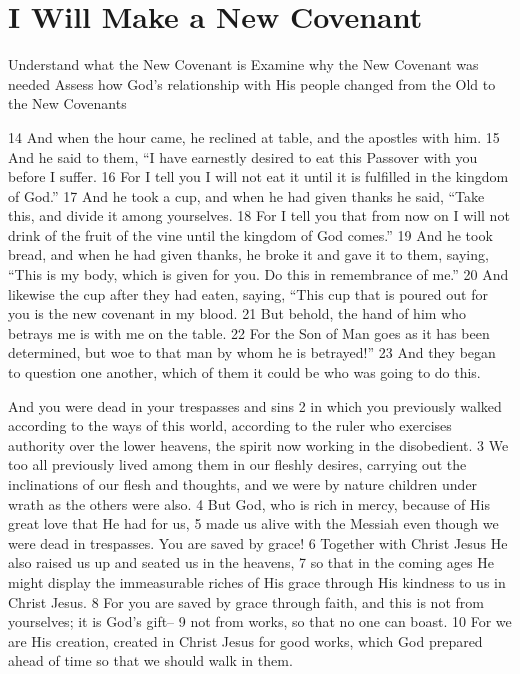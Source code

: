 \chapter{I Will Make a New Covenant}

\begin{goals}
\goal Understand what the New Covenant is
\goal Examine why the New Covenant was needed
\goal Assess how God's relationship with His people changed from the Old to the New Covenants
\end{goals}

\begin{bible}


14 And when the hour came, he reclined at table, and the apostles with him. 15 And he said to them, ``I have earnestly desired to eat this Passover with you before I suffer. 16 For I tell you I will not eat it until it is fulfilled in the kingdom of God.'' 17 And he took a cup, and when he had given thanks he said, ``Take this, and divide it among yourselves. 18 For I tell you that from now on I will not drink of the fruit of the vine until the kingdom of God comes.'' 19 And he took bread, and when he had given thanks, he broke it and gave it to them, saying, ``This is my body, which is given for you. Do this in remembrance of me.'' 20 And likewise the cup after they had eaten, saying, ``This cup that is poured out for you is the new covenant in my blood. 21 But behold, the hand of him who betrays me is with me on the table. 22 For the Son of Man goes as it has been determined, but woe to that man by whom he is betrayed!'' 23 And they began to question one another, which of them it could be who was going to do this.


And you were dead in your trespasses and sins 2 in which you previously walked according to the ways of this world, according to the ruler who exercises authority over the lower heavens, the spirit now working in the disobedient. 3 We too all previously lived among them in our fleshly desires, carrying out the inclinations of our flesh and thoughts, and we were by nature children under wrath as the others were also. 4 But God, who is rich in mercy, because of His great love that He had for us, 5 made us alive with the Messiah even though we were dead in trespasses. You are saved by grace! 6 Together with Christ Jesus He also raised us up and seated us in the heavens, 7 so that in the coming ages He might display the immeasurable riches of His grace through His kindness to us in Christ Jesus. 8 For you are saved by grace through faith, and this is not from yourselves; it is God's gift-- 9 not from works, so that no one can boast. 10 For we are His creation, created in Christ Jesus for good works, which God prepared ahead of time so that we should walk in them.


\end{bible}
